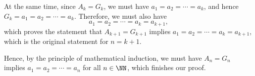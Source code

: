 \begin{enumerate}
\begin{enumerate}
                    At the same time, since \(A_k = G_k\), we must have \(a_1 = a_2 = \cdots = a_k\), and hence \(G_k = a_1 = a_2 = \cdots = a_k\). Therefore, we must also have
                    \[
                        a_1 = a_2 = \cdots = a_k = a_{k + 1},
                    \]
                    which proves the statement that \(A_{k + 1} = G_{k + 1}\) implies \(a_1 = a_2 = \cdots = a_k = a_{k + 1}\), which is the original statement for \(n = k + 1\).

                    Hence, by the principle of mathematical induction, we must have \(A_n = G_n\) implies \(a_1 = a_2 = \cdots = a_n\) for all \(n \in \NN\), which finishes our proof.
          \end{enumerate}
\end{enumerate}